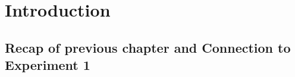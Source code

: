 




\section{Introduction}

\subsection{Recap of previous chapter and Connection to Experiment 1}

